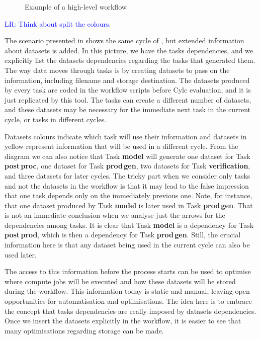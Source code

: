 \documentclass{superfri}
\newcommand{\lr}[1]{\textcolor{blue}{LR: #1}}
\begin{document}
\begin{figure}[b]
\begin{minipage}{.45\linewidth}
        \label{fig:cycle-io-dep}
    \end{minipage}
    \vspace{5pt}
    \caption{Example of a high-level workflow}
    \label{fig:cycle}
\end{figure}

\lr{Think about split the colours.  }

The scenario presented in  shows the same cycle of , but extended information about datasets is added.
In this picture, we have the tasks dependencies, and we explicitly list the datasets dependencies regarding the tasks that generated them.
The way data moves through tasks is by creating datasets to pass on the information, including filename and storage destination.
The datasets produced by every task are coded in the workflow scripts before Cylc evaluation, and it is just replicated by this tool. The tasks can create a different number of datasets, and these datasets may be necessary for the immediate next task in the current cycle, or tasks in different cycles.

Datasets colours indicate which task will use their information and datasets in yellow represent information that will be used in a different cycle. From the diagram we can also notice that Task \textbf{model} will generate one dataset for Task \textbf{post\,proc}, one dataset for Task \textbf{prod\,gen}, two datasets for Task \textbf{verification}, and three datasets for later cycles. The tricky part when we consider only tasks and not the datasets in the workflow is that it may lead to the false impression that one task depends only on the immediately previous one. Note, for instance, that one dataset produced by Task \textbf{model} is later used in Task \textbf{prod\,gen}. That is not an immediate conclusion when we analyse just the arrows for the dependencies among tasks. It is clear that Task \textbf{model} is a dependency for Task \textbf{post\,prod}, which is then a dependency for Task \textbf{prod\,gen}. Still, the crucial information here is that any dataset being used in the current cycle can also be used later.

The access to this information before the process starts can be used to optimise where compute jobs will be executed and how these datasets will be stored during the workflow.
This information today is static and manual, leaving open opportunities for automatisation and optimisations.
The idea here is to embrace the concept that tasks dependencies are really imposed by datasets dependencies.
Once we insert the datasets explicitly in the workflow, it is easier to see that many optimisations regarding storage can be made.
\end{document}

